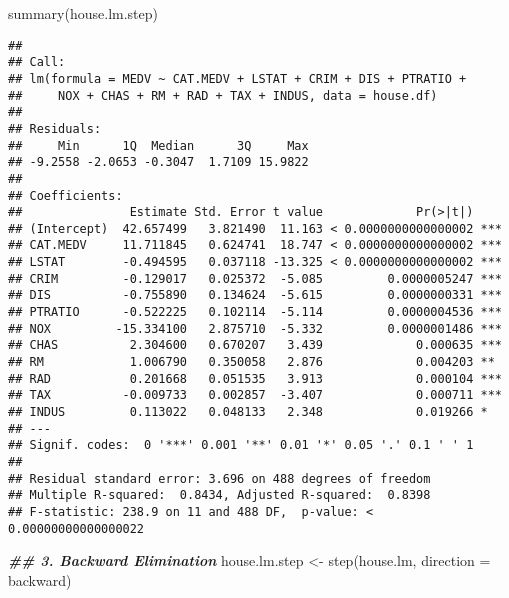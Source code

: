 \documentclass[
]{article}
\newenvironment{Shaded}{\begin{snugshade}}{\end{snugshade}}
\newcommand{\AttributeTok}[1]{\textcolor[rgb]{0.77,0.63,0.00}{#1}}
\newcommand{\DocumentationTok}[1]{\textcolor[rgb]{0.56,0.35,0.01}{\textbf{\textit{#1}}}}
\newcommand{\FunctionTok}[1]{\textcolor[rgb]{0.00,0.00,0.00}{#1}}
\newcommand{\NormalTok}[1]{#1}
\newcommand{\OtherTok}[1]{\textcolor[rgb]{0.56,0.35,0.01}{#1}}
\newcommand{\StringTok}[1]{\textcolor[rgb]{0.31,0.60,0.02}{#1}}
\begin{document}
\begin{Shaded}
\begin{Highlighting}[]
\FunctionTok{summary}\NormalTok{(house.lm.step) }
\end{Highlighting}
\end{Shaded}

\begin{verbatim}
## 
## Call:
## lm(formula = MEDV ~ CAT.MEDV + LSTAT + CRIM + DIS + PTRATIO + 
##     NOX + CHAS + RM + RAD + TAX + INDUS, data = house.df)
## 
## Residuals:
##     Min      1Q  Median      3Q     Max 
## -9.2558 -2.0653 -0.3047  1.7109 15.9822 
## 
## Coefficients:
##               Estimate Std. Error t value             Pr(>|t|)    
## (Intercept)  42.657499   3.821490  11.163 < 0.0000000000000002 ***
## CAT.MEDV     11.711845   0.624741  18.747 < 0.0000000000000002 ***
## LSTAT        -0.494595   0.037118 -13.325 < 0.0000000000000002 ***
## CRIM         -0.129017   0.025372  -5.085         0.0000005247 ***
## DIS          -0.755890   0.134624  -5.615         0.0000000331 ***
## PTRATIO      -0.522225   0.102114  -5.114         0.0000004536 ***
## NOX         -15.334100   2.875710  -5.332         0.0000001486 ***
## CHAS          2.304600   0.670207   3.439             0.000635 ***
## RM            1.006790   0.350058   2.876             0.004203 ** 
## RAD           0.201668   0.051535   3.913             0.000104 ***
## TAX          -0.009733   0.002857  -3.407             0.000711 ***
## INDUS         0.113022   0.048133   2.348             0.019266 *  
## ---
## Signif. codes:  0 '***' 0.001 '**' 0.01 '*' 0.05 '.' 0.1 ' ' 1
## 
## Residual standard error: 3.696 on 488 degrees of freedom
## Multiple R-squared:  0.8434, Adjusted R-squared:  0.8398 
## F-statistic: 238.9 on 11 and 488 DF,  p-value: < 0.00000000000000022
\end{verbatim}

\begin{Shaded}
\begin{Highlighting}[]
\DocumentationTok{\#\# 3. Backward Elimination}
\NormalTok{house.lm.step }\OtherTok{\textless{}{-}} \FunctionTok{step}\NormalTok{(house.lm, }\AttributeTok{direction =} \StringTok{\textquotesingle{}backward\textquotesingle{}}\NormalTok{)}
\end{Highlighting}
\end{Shaded}
\end{document}
